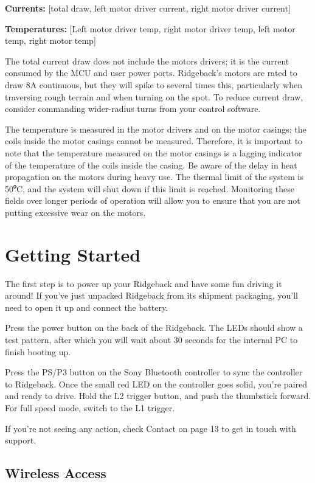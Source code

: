 \documentclass[]{clearpath-latex/clearpath-manual}
\begin{document}
\textbf{Currents:} [total draw, left motor driver current, right motor driver current]

\textbf{Temperatures:} [Left motor driver temp, right motor driver temp, left motor temp, right motor temp]

The total current draw does not include the motors drivers; it is the current consumed by the MCU and user power ports. Ridgeback's motors are rated to draw 8A continuous, but they will spike to several times this, particularly when traversing rough terrain and when turning on the spot. To reduce current draw, consider commanding wider-radius turns from your control software.

The temperature is measured in the motor drivers and on the motor casings; the coils inside the motor casings cannot be measured. Therefore, it is important to note that the temperature measured on the motor casings is a lagging indicator of the temperature of the coils inside the casing. Be aware of the delay in heat propagation on the motors during heavy use. The thermal limit of the system is 50⁰C, and the system will shut down if this limit is reached.  Monitoring these fields over longer periods of operation will allow you to ensure that you are not putting excessive wear on the motors.

\section{Getting Started}

The first step is to power up your Ridgeback and have some fun driving it around! If you’ve just unpacked Ridgeback
from its shipment packaging, you’ll need to open it up and connect the battery.

Press the power button on the back of the Ridgeback. The LEDs should show a test pattern, after which you will
wait about 30 seconds for the internal PC to finish booting up.

Press the PS/P3 button on the Sony Bluetooth controller to sync the controller to Ridgeback. Once the small red
LED on the controller goes solid, you’re paired and ready to drive. Hold the L2 trigger button, and push the
thumbstick forward. For full speed mode, switch to the L1 trigger.

If you’re not seeing any action, check Contact on page 13 to get in touch with support.

\subsection{Wireless Access}
\end{document}
